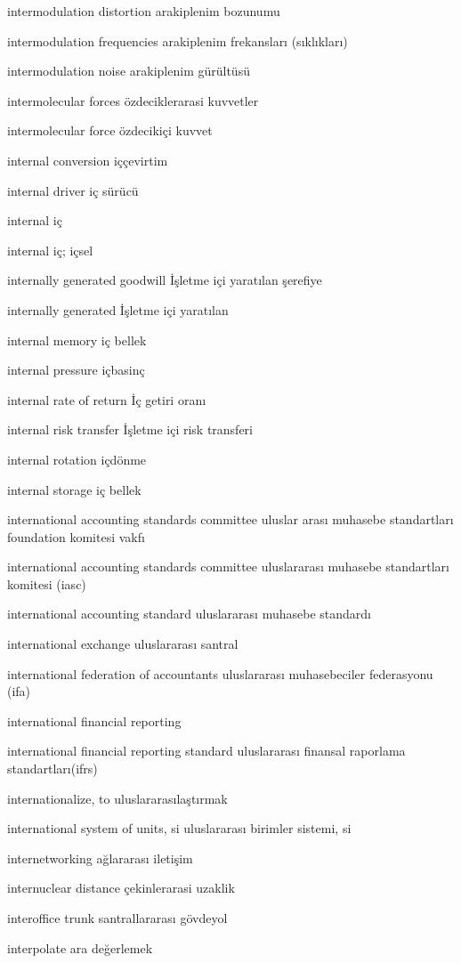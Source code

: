 \documentclass[12pt,fleqn]{article}\usepackage{../../common}
\begin{document}
intermodulation distortion arakiplenim bozunumu

intermodulation frequencies arakiplenim frekansları (sıklıkları)

intermodulation noise arakiplenim gürültüsü

intermolecular forces özdeciklerarasi kuvvetler

intermolecular force özdecikiçi kuvvet

internal conversion iççevirtim

internal driver iç sürücü

internal iç

internal iç; içsel

internally generated goodwill İşletme içi yaratılan şerefiye

internally generated İşletme içi yaratılan

internal memory iç bellek

internal pressure içbasinç

internal rate of return İç getiri oranı

internal risk transfer İşletme içi risk transferi

internal rotation içdönme

internal storage iç bellek

international accounting standards committee uluslar arası muhasebe standartları foundation komitesi vakfı

international accounting standards committee uluslararası muhasebe standartları komitesi (iasc)

international accounting standard uluslararası muhasebe standardı

international exchange uluslararası santral

international federation of accountants uluslararası muhasebeciler federasyonu (ifa)

international financial reporting

international financial reporting standard uluslararası finansal raporlama standartları(ifrs)

internationalize, to uluslararasılaştırmak

international system of units, si uluslararası birimler sistemi, si

internetworking ağlararası iletişim

internuclear distance çekinlerarasi uzaklik

interoffice trunk santrallararası gövdeyol

interpolate ara değerlemek
\end{document}

